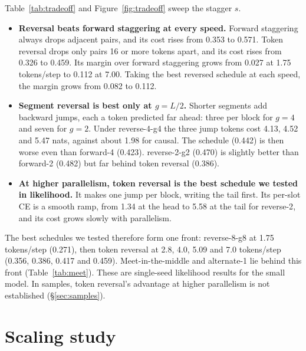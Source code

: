 \documentclass[11pt]{article}
\theoremstyle{definition}
\theoremstyle{remark}
\newcommand{\sch}[1]{\textsf{#1}}
\begin{document}
Table~\ref{tab:tradeoff} and Figure~\ref{fig:tradeoff} sweep the stagger $s$.
\begin{itemize}
  \item \textbf{Reversal beats forward staggering at every speed.} Forward staggering always drops adjacent pairs, and its cost rises from 0.353 to 0.571. Token reversal drops only pairs 16 or more tokens apart, and its cost rises from 0.326 to 0.459. Its margin over forward staggering grows from 0.027 at 1.75 tokens/step to 0.112 at 7.00. Taking the best reversed schedule at each speed, the margin grows from 0.082 to 0.112.
  \item \textbf{Segment reversal is best only at $g=L/2$.} Shorter segments add backward jumps, each a token predicted far ahead: three per block for $g=4$ and seven for $g=2$. Under \sch{reverse-4-g4} the three jump tokens cost 4.13, 4.52 and 5.47 nats, against about 1.98 for causal. The schedule (0.442) is then worse even than \sch{forward-4} (0.423). \sch{reverse-2-g2} (0.470) is slightly better than \sch{forward-2} (0.482) but far behind token reversal (0.386).
  \item \textbf{At higher parallelism, token reversal is the best schedule we tested in likelihood.} It makes one jump per block, writing the tail first. Its per-slot CE is a smooth ramp, from 1.34 at the head to 5.58 at the tail for \sch{reverse-2}, and its cost grows slowly with parallelism.
\end{itemize}
The best schedules we tested therefore form one front: \sch{reverse-8-g8} at 1.75 tokens/step (0.271), then token reversal at 2.8, 4.0, 5.09 and 7.0 tokens/step (0.356, 0.386, 0.417 and 0.459).
Meet-in-the-middle and \sch{alternate-1} lie behind this front (Table~\ref{tab:meet}).
These are single-seed likelihood results for the small model.
In samples, token reversal's advantage at higher parallelism is not established (\S\ref{sec:samples}).

\section{Scaling study}
\label{app:scaling}
\end{document}
